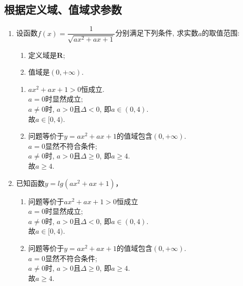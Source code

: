 \subsection*{根据定义域、值域求参数}
\begin{enumerate}
    \item 设函数$f(x)=\dfrac{1}{\sqrt{ax^2+ax+1}}$分别满足下列条件, 求实数$a$的取值范围: 
    \begin{enumerate}
    \item 定义域是$\mathbf{R}$; 
    \item 值域是$(0,+\infty)$. 
    \end{enumerate}
    \begin{jieda}
        \begin{enumerate}
        \item $ax^2+ax+1>0$恒成立. \\
        $a=0$时显然成立; \\
        $a\neq 0$时, $a>0$且$ \Delta<0$, 即$a\in(0,4)$. \\
        故$a\in[0,4)$. 
        
        \item 问题等价于$y=ax^2+ax+1$的值域包含$(0,+\infty)$. \\
        $a=0$显然不符合条件; \\
        $a\neq 0$时, $a>0$且$\Delta\geq0$, 即$a\geq 4$. \\
        故$a\geq 4$. 
        \end{enumerate}
    \end{jieda}
    
        \item  已知函数$y = lg(ax^2+ax+1)$，
        \begin{jieda}
            \begin{enumerate}
                \item 问题等价于$ax^2+ax+1 > 0$恒成立 \\
                $a=0$时显然成立; \\
                $a\neq 0$时, $a>0$且$ \Delta<0$, 即$a\in(0,4)$. \\
                故$a\in[0,4)$. 
                \item 问题等价于$y=ax^2+ax+1$的值域包含$(0,+\infty)$. \\
                $a=0$显然不符合条件; \\
                $a\neq 0$时, $a>0$且$\Delta\geq0$, 即$a\geq 4$. \\
                故$a\geq 4$.
            \end{enumerate}
        \end{jieda}
\end{enumerate}

